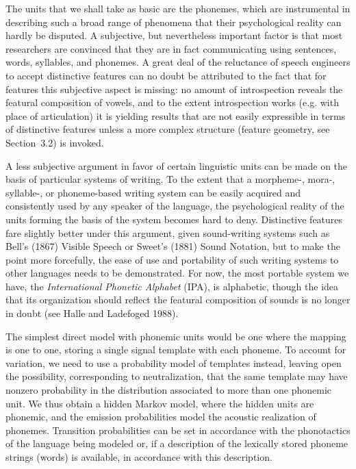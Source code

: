 The units that we shall take as basic are the phonemes, which are instrumental
in describing such a broad range of phenomena that their psychological reality
can hardly be disputed. A subjective, but nevertheless important factor is
that most researchers are convinced that they are in fact communicating using
sentences, words, syllables, and phonemes. A great deal of the reluctance of
speech engineers to accept distinctive features can no doubt be attributed to
the fact that for features this subjective aspect is missing: no amount of
introspection reveals the featural composition of vowels, and to the extent
introspection works (e.g. with place of articulation) it is yielding results
that are not easily expressible in terms of distinctive features unless a more
complex structure (feature geometry, see Section~3.2) is invoked.

A less subjective argument in favor of certain linguistic units can be made on
the basis of particular systems of writing. To the extent that a morpheme-,
mora-, syllable-, or phoneme-based writing system can be easily acquired and
consistently used by any speaker of the language, the psychological reality of
the units forming the basis of the system becomes hard to deny.  Distinctive
features fare slightly better under this argument, given sound-writing systems
such as Bell's (1867) Visible Speech or Sweet's (1881) Sound Notation, but to
make the point more forcefully, the ease of use and portability of such writing
systems to other languages needs to be demonstrated. For now, the most
portable system we have, the {\it International Phonetic Alphabet} (IPA), is
alphabetic, though the idea that its organization should reflect the featural 
composition of sounds is no longer in doubt (see Halle and Ladefoged 1988).
\nocite{Bell:1867}\nocite{Sweet:1881}\nocite{Halle:1988}

The simplest direct model with phonemic units would be one where the mapping
is one to one, storing a single signal template with each phoneme. To account
for variation, we need to use a probability model of templates instead,
leaving open the possibility, corresponding to neutralization, that the same
template may have nonzero probability in the distribution associated to more
than one phonemic unit. We thus obtain a hidden Markov model, where the hidden
units are phonemic, and the emission probabilities model the acoustic
realization of phonemes. Transition probabilities can be set in accordance
with the phonotactics of the language being modeled or, if a description of
the lexically stored phoneme strings (words) is available, in accordance with 
this description. 

